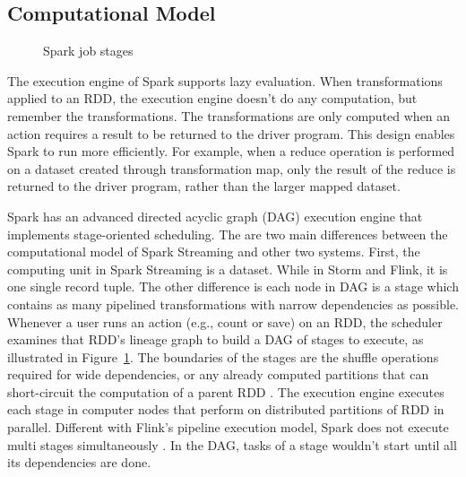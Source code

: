 \subsection{Computational Model}

\begin{figure}
  \begin{center}
   \caption{Spark job stages\cite{zaharia2012resilient}}
   \label{fig:spark_stage}
  \end{center}
\end{figure}

The execution engine of Spark supports lazy evaluation. When transformations applied to an RDD, the execution engine doesn't do any computation, but remember the transformations. The transformations are only computed when an action requires a result to be returned to the driver program. This design enables Spark to run more efficiently. For example, when a reduce operation is performed on a dataset created through transformation map, only the result of the reduce is returned to the driver program, rather than the larger mapped dataset.

Spark has an advanced directed acyclic graph (DAG) execution engine that implements stage-oriented scheduling. The are two main differences between the computational model of Spark Streaming and other two systems. First, the computing unit in Spark Streaming is a dataset. While in Storm and Flink, it is one single record tuple. The other difference is each node in DAG is a stage which contains as many pipelined transformations with narrow dependencies as possible. Whenever a user runs an action (e.g., count or save) on an RDD, the scheduler examines that RDD's lineage graph to build a DAG of stages to execute, as illustrated in Figure~\ref{fig:spark_stage}. The boundaries of the stages are the shuffle operations required for wide dependencies, or any already computed partitions that can short-circuit the computation of a parent RDD \cite{zaharia2012resilient}. The execution engine executes each stage in computer nodes that perform on distributed partitions of RDD in parallel. Different with Flink's pipeline execution model, Spark does not execute multi stages simultaneously \cite{shi2015clash}. In the DAG, tasks of a stage wouldn't start until all its dependencies are done. 


